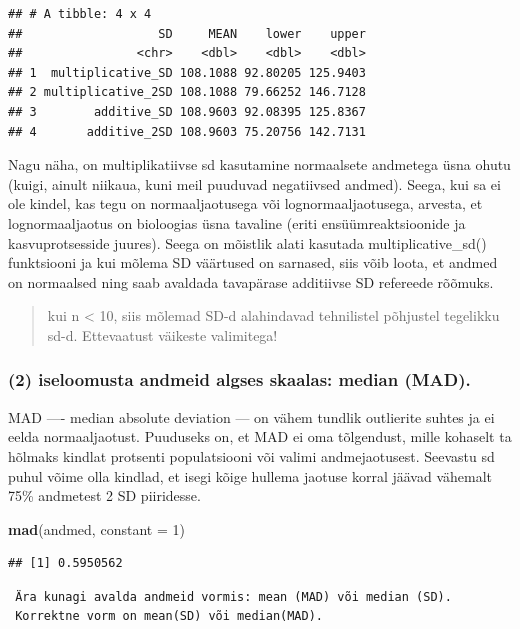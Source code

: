 \documentclass[]{book}
\newenvironment{Shaded}{\begin{snugshade}}{\end{snugshade}}
\newcommand{\KeywordTok}[1]{\textcolor[rgb]{0.13,0.29,0.53}{\textbf{#1}}}
\newcommand{\DataTypeTok}[1]{\textcolor[rgb]{0.13,0.29,0.53}{#1}}
\newcommand{\DecValTok}[1]{\textcolor[rgb]{0.00,0.00,0.81}{#1}}
\newcommand{\NormalTok}[1]{#1}
\begin{document}
\begin{verbatim}
## # A tibble: 4 x 4
##                   SD     MEAN    lower    upper
##                <chr>    <dbl>    <dbl>    <dbl>
## 1  multiplicative_SD 108.1088 92.80205 125.9403
## 2 multiplicative_2SD 108.1088 79.66252 146.7128
## 3        additive_SD 108.9603 92.08395 125.8367
## 4       additive_2SD 108.9603 75.20756 142.7131
\end{verbatim}

Nagu näha, on multiplikatiivse sd kasutamine normaalsete andmetega üsna
ohutu (kuigi, ainult niikaua, kuni meil puuduvad negatiivsed andmed).
Seega, kui sa ei ole kindel, kas tegu on normaaljaotusega või
lognormaaljaotusega, arvesta, et lognormaaljaotus on bioloogias üsna
tavaline (eriti ensüümreaktsioonide ja kasvuprotsesside juures). Seega
on mõistlik alati kasutada multiplicative\_sd() funktsiooni ja kui
mõlema SD väärtused on sarnased, siis võib loota, et andmed on
normaalsed ning saab avaldada tavapärase additiivse SD refereede
rõõmuks.

\begin{quote}
kui n \textless{} 10, siis mõlemad SD-d alahindavad tehnilistel
põhjustel tegelikku sd-d. Ettevaatust väikeste valimitega!
\end{quote}

\subsubsection{(2) iseloomusta andmeid algses skaalas: median
(MAD).}\label{iseloomusta-andmeid-algses-skaalas-median-mad.}

MAD ---- median absolute deviation --- on vähem tundlik outlierite
suhtes ja ei eelda normaaljaotust. Puuduseks on, et MAD ei oma
tõlgendust, mille kohaselt ta hõlmaks kindlat protsenti populatsiooni
või valimi andmejaotusest. Seevastu sd puhul võime olla kindlad, et
isegi kõige hullema jaotuse korral jäävad vähemalt 75\% andmetest 2 SD
piiridesse.

\begin{Shaded}
\begin{Highlighting}[]
\KeywordTok{mad}\NormalTok{(andmed, }\DataTypeTok{constant =} \DecValTok{1}\NormalTok{)}
\end{Highlighting}
\end{Shaded}

\begin{verbatim}
## [1] 0.5950562
\end{verbatim}

\begin{verbatim}
 Ära kunagi avalda andmeid vormis: mean (MAD) või median (SD). 
 Korrektne vorm on mean(SD) või median(MAD).
\end{verbatim}
\end{document}
